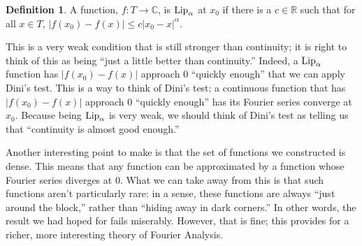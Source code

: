 \documentclass{amsart}
\newcommand{\al}{\alpha} %
\newcommand{\C}{\mathbb{C}}
\newcommand{\R}{\mathbb{R}}
\newcommand{\Lip}{\text{\rm Lip}}
\newcommand{\absval}[1]{\left| #1 \right|}
\theoremstyle{definition}
\newtheorem{definition}[thm]{Definition}
\begin{document}
\begin{definition}
A function, $f: T \to \C$, is $\Lip_\al$ at $x_0$ if there is a $c \in \R$ such that for all $x \in T$, $\absval{f(x_0) - f(x)} \leq c\absval{x_0-x}^\al$. 
\end{definition}

This is a very weak condition that is still stronger than continuity; it is right to think of this as being ``just a little better than continuity.''
Indeed, a $\Lip_\al$ function has $\absval{f(x_0) - f(x)}$ approach $0$ ``quickly enough'' that we can apply Dini's test.
This is a way to think of Dini's test; a continuous function that has $\absval{f(x_0) - f(x)}$ approach $0$ ``quickly enough'' has its Fourier series converge at $x_0$. 
Because being $\Lip_\al$ is very weak, we should think of Dini's test as telling us that ``continuity is almost good enough.''


Another interesting point to make is that the set of functions we constructed is dense. 
This means that any function can be approximated by a function whose Fourier series diverges at $0$. 
What we can take away from this is that such functions aren't particularly rare: in a sense, these functions are always ``just around the block,'' rather than ``hiding away in dark corners.''
In other words, the result we had hoped for fails miserably. 
However, that is fine; this provides for a richer, more interesting theory of Fourier Analysis.



\end{document}
